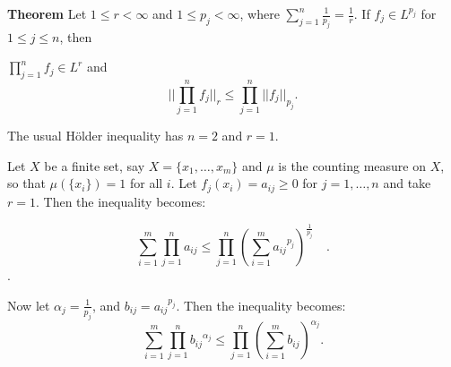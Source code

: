 \documentclass[12pt]{article}
\begin{document}
\textbf{Theorem} Let $1 \le r < \infty$ and $1 \le p_j < \infty$, where
$\sum_{j=1}^{n} \frac{1}{p_j} = \frac{1}{r}$. If $f_j \in L^{p_j}$ for $1 \le j \le n$, then

$\prod_{j=1}^{n} f_j \in L^r$ and
$$
|| \prod_{j=1}^{n} f_j ||_r \le \prod_{j=1}^{n} ||f_j||_{p_j} .
$$

The usual H\"older inequality has $n=2$ and $r=1$.

Let  $X$ be a finite  set, say $X=\{x_1, \ldots, x_m\}$ and $\mu$ is the counting measure on $X$, so that $\mu(\{x_i\}) = 1$ for all $i$. Let 
$f_j(x_i) = a_{ij} \ge 0$ for $j=1, \ldots, n$ and take $r=1$. Then the inequality becomes:

$$
\sum_{i=1}^{m} \prod_{j=1}^{n} a_{ij} \le \prod_{j=1}^n ( \sum_{i=1}^{m} {a_{ij}}^{p_j})^{\frac{1}{p_j}} \quad.
$$.

Now let $\alpha_j = \frac{1}{p_j}$,  and $b_{ij} = {a_{ij}}^{p_j}$. Then the
inequality becomes:
$$
\sum_{i=1}^{m} \prod_{j=1}^{n} {b_{ij}}^{\alpha_{j}} \le \prod_{j=1}^{n} (\sum_{i=1}^{m} b_{ij}) ^ {\alpha_{j}}.
$$

\end{document}
